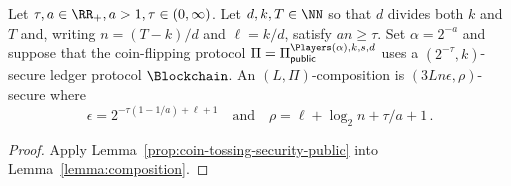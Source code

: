 \begin{corollary}\label{coro:beacon-Bernoulli}
  Let $\tau, a \in \RR_+, a > 1, \tau \in (0, \infty)$. 
  Let $d, k, T \in \NN$ 
  so that $d$ divides both $k$ and $T$ and, 
  writing $n = (T - k)/d$ and $\ell = k/d$, 
  satisfy $a n \geq \tau$.
  Set $\alpha = 2^{-a}$ and 
  suppose that the coin-flipping protocol $\Pi = \CoinTossingPublic$ 
  uses a $(2^{-\tau}, k)$-secure ledger protocol $\Blockchain$.
  An $(L, \Pi)$-composition is $(3 L n \epsilon, \rho)$-secure where
  $$
    \epsilon = 2^{- \tau(1 - 1/a) + \ell + 1}
    \quad\text{and} \quad
    \rho = \ell + \log_2 n + \tau/a + 1
    \,.
  $$
\end{corollary}
\begin{proof}
  Apply  
  Lemma~\ref{prop:coin-tossing-security-public} into 
  Lemma~\ref{lemma:composition}.
\end{proof}
